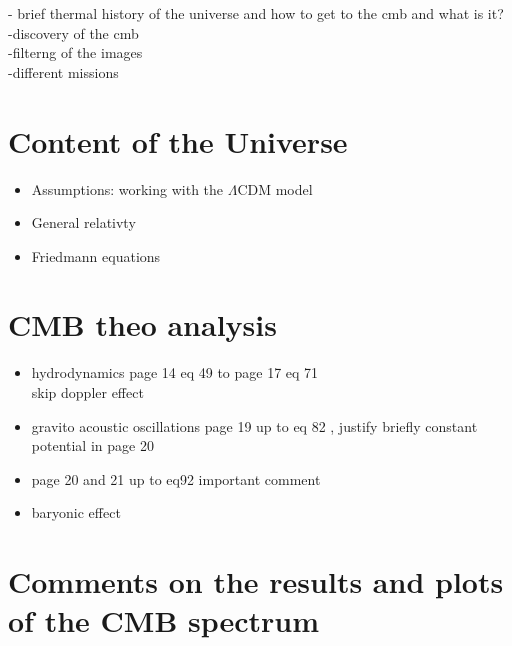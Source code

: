 \documentclass{article}
\begin{document}
-\citep{WayneHu} brief thermal history of the universe and how to get to the cmb and what is it?\\

\citep{bucherPhysicsCosmicMicrowave2015}
-discovery of the cmb\\
-filterng of the images\\
-different missions\\

\section{Content of the Universe}
\begin{itemize}
\item Assumptions: working with the $\Lambda$CDM model
\item General relativty
\item Friedmann equations
\end{itemize}

\section{CMB theo analysis}
\begin{itemize}
\item hydrodynamics \citep{huLectureNotesCMB2008}
page 14 eq 49 to page 17 eq 71\\
skip doppler effect
\item gravito acoustic oscillations page 19 up to eq 82 , justify briefly constant potential in page 20
\item page 20 and 21 up to eq92 important comment 
\item baryonic effect
\end{itemize}

\section{Comments on the results and plots of the CMB spectrum}
\end{document}
